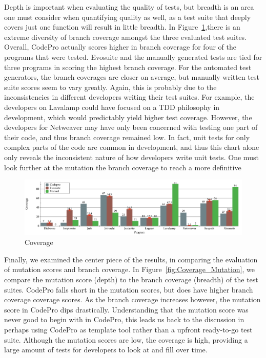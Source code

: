 \documentclass[conference]{IEEEtran}
\begin{document}
Depth is important when evaluating the quality of tests, but breadth is an area one must consider when quantifying quality as well, as a test suite that deeply covers just one function will result in little breadth. In Figure~\ref{fig:Coverage},there is an extreme diversity of branch coverage amongst the three evaluated test suites. Overall, CodePro actually scores higher in branch coverage for four of the programs that were tested. Evosuite and the manually generated tests are tied for three programs in scoring the highest branch coverage. For the automated test generators, the branch coverages are closer on average, but manually written test suite scores seem to vary greatly. Again, this is probably due to the inconsistencies in different developers writing their test suites. For example, the developers on Lavalamp could have focused on a TDD philosophy in development, which would predictably yield higher test coverage. However, the developers for Netweaver may have only been concerned with testing one part of their code, and thus branch coverage remained low. In fact, unit tests for only complex parts of the code are common in development, and thus this chart alone only reveals the inconsistent nature of how developers write unit tests. One must look further at the mutation the branch coverage to reach a more definitive 

\begin{figure}[!t]
\centering
  \includegraphics[width=\textwidth]{Coverage}
    \caption{Coverage}
  \label{fig:Coverage}
\end{figure}

Finally, we examined the center piece of the results, in comparing the evaluation of mutation scores and branch coverage. In Figure~\ref{fig:Coverage_Mutation}, we compare the mutation score (depth) to the branch coverage (breadth) of the test suites. CodePro falls short in the mutation scores, but does have higher branch coverage coverage scores. As the branch coverage increases however, the mutation score in CodePro dips drastically. Understanding that the mutation score was never good to begin with in CodePro, this leads us back to the discussion in perhaps using CodePro as template tool rather than a upfront ready-to-go test suite. Although the mutation scores are low, the coverage is high, providing a large amount of tests for developers to look at and fill over time. 
\end{document}
